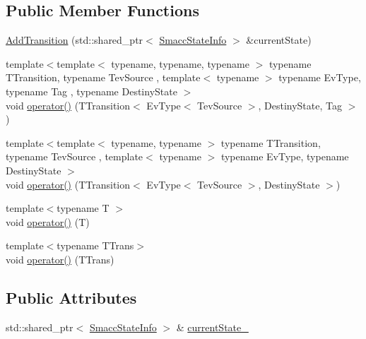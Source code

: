 \subsection*{Public Member Functions}
\begin{DoxyCompactItemize}
\item 
\hyperlink{structsmacc_1_1introspection_1_1AddTransition_a7bec012404747e4ab3eb6ca32cf06ba7}{Add\+Transition} (std\+::shared\+\_\+ptr$<$ \hyperlink{classsmacc_1_1introspection_1_1SmaccStateInfo}{Smacc\+State\+Info} $>$ \&current\+State)
\item 
{\footnotesize template$<$template$<$ typename, typename, typename $>$ typename T\+Transition, typename Tev\+Source , template$<$ typename $>$ typename Ev\+Type, typename Tag , typename Destiny\+State $>$ }\\void \hyperlink{structsmacc_1_1introspection_1_1AddTransition_a40896e3e99a230be221d1a9733cb5e50}{operator()} (T\+Transition$<$ Ev\+Type$<$ Tev\+Source $>$, Destiny\+State, Tag $>$)
\item 
{\footnotesize template$<$template$<$ typename, typename $>$ typename T\+Transition, typename Tev\+Source , template$<$ typename $>$ typename Ev\+Type, typename Destiny\+State $>$ }\\void \hyperlink{structsmacc_1_1introspection_1_1AddTransition_ae418fea0a96b2b2da60fb2f42a8c99cf}{operator()} (T\+Transition$<$ Ev\+Type$<$ Tev\+Source $>$, Destiny\+State $>$)
\item 
{\footnotesize template$<$typename T $>$ }\\void \hyperlink{structsmacc_1_1introspection_1_1AddTransition_a3f9708b6493a5747fbe77361d9711daa}{operator()} (T)
\item 
{\footnotesize template$<$typename T\+Trans$>$ }\\void \hyperlink{structsmacc_1_1introspection_1_1AddTransition_abfe5dedcabfcc1fa94f767320f9089ab}{operator()} (T\+Trans)
\end{DoxyCompactItemize}
\subsection*{Public Attributes}
\begin{DoxyCompactItemize}
\item 
std\+::shared\+\_\+ptr$<$ \hyperlink{classsmacc_1_1introspection_1_1SmaccStateInfo}{Smacc\+State\+Info} $>$ \& \hyperlink{structsmacc_1_1introspection_1_1AddTransition_a56fd9b1bdf6761bbe5258dc915481f4b}{current\+State\+\_\+}
\end{DoxyCompactItemize}


